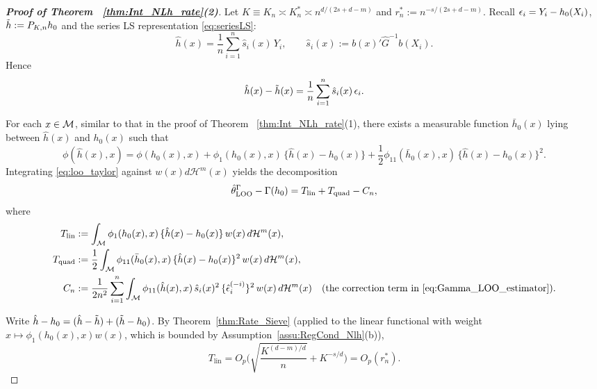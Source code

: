 \documentclass[12pt,american]{article}
\newcommand{\cH}{\mathcal{H}}
\theoremstyle{definition}
\theoremstyle{plain}
\theoremstyle{definition}
\theoremstyle{plain}
\theoremstyle{plain}
\theoremstyle{plain}
\theoremstyle{plain}
\theoremstyle{plain}
\begin{document}
\begin{proof}[\textbf{Proof of Theorem ~\ref{thm:Int_NLh_rate}(2)}]
Let $K\equiv K_n\asymp K_n^*\asymp n^{d/(2s+d-m)}$ and $r_n^*:=n^{-s/(2s+d-m)}$.
Recall $\epsilon_i=Y_i-h_0(X_i)$, $\tilde{h}:=P_{K,n}h_0$ and the series LS representation \eqref{eq:seriesLS}:
\begin{equation}\label{eq:loo_series_rep}
\hat h(x)=\frac1n\sum_{i=1}^n \hat s_i(x)\,Y_i,\qquad \hat s_i(x):=b(x)'\hat G^{-1}b(X_i).
\end{equation}
Hence
\begin{equation}\label{eq:loo_stoch_part}
\hat h(x)-\tilde{h}(x)=\frac1n\sum_{i=1}^n \hat s_i(x)\,\epsilon_i.
\end{equation}

\smallskip
For each $x\in\mathcal{M}$, similar to that in the proof of Theorem ~\ref{thm:Int_NLh_rate}(1),
there exists a measurable function $\bar h_0(x)$ lying between $\hat h(x)$ and $h_0(x)$ such that
\begin{equation}\label{eq:loo_taylor}
\phi(\hat h(x),x)=\phi(h_0(x),x)+\phi_1(h_0(x),x)\,\{\hat h(x)-h_0(x)\}+\frac12\phi_{11}(\bar h_0(x),x)\,\{\hat h(x)-h_0(x)\}^2.
\end{equation}
Integrating \eqref{eq:loo_taylor} against $w(x)d\cH^m(x)$ yields the decomposition
\begin{equation}\label{eq:loo_decomp_main}
\hat\theta^{\Gamma}_{\text{LOO}}-\Gamma(h_0)=T_{\text{lin}}+T_{\text{quad}}-C_n,
\end{equation}
where
\begin{align*}
T_{\text{lin}}&:=\int_{\cM}\phi_1(h_0(x),x)\,\{\hat h(x)-h_0(x)\}\,w(x)\,d\cH^m(x),\\
T_{\text{quad}}&:=\frac12\int_{\cM}\phi_{11}(\bar h_0(x),x)\,\{\hat h(x)-h_0(x)\}^2\,w(x)\,d\cH^m(x),\\
C_n&:=\frac{1}{2n^2}\sum_{i=1}^n\int_{\cM}\phi_{11}(\hat h(x),x)\,\hat s_i(x)^2\,\{\hat\e_i^{(-i)}\}^2\,w(x)\,d\cH^m(x)
\quad\text{(the correction term in \eqref{eq:Gamma_LOO_estimator}).}
\end{align*}

\smallskip
Write $\hat h-h_0=(\hat h-\tilde{h})+(\tilde{h}-h_0)$.
By Theorem~\ref{thm:Rate_Sieve} (applied to the linear functional with weight $x\mapsto \phi_1(h_0(x),x)w(x)$, which is bounded by Assumption~\ref{assu:RegCond_Nlh}(b)),
\begin{equation}\label{eq:loo_Tlin_rate}
T_{\text{lin}}=O_p\Big(\sqrt{\frac{K^{(d-m)/d}}{n}}+K^{-s/d}\Big)=O_p(r_n^*).
\end{equation}


\end{proof}
\end{document}

